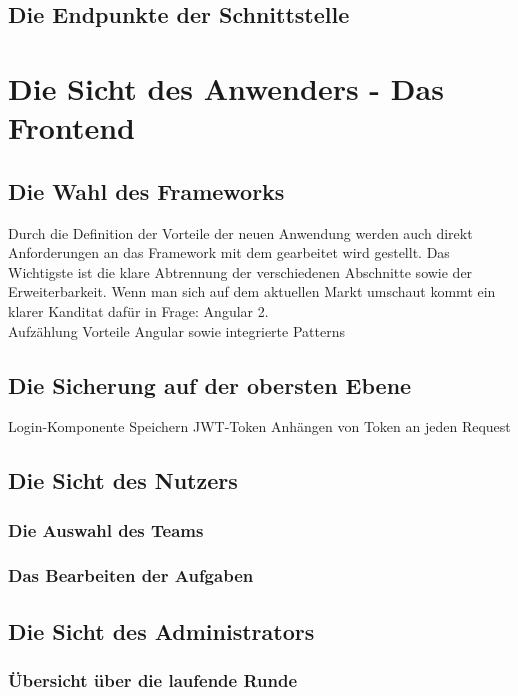 \section{Die Endpunkte der Schnittstelle}


\chapter{Die Sicht des Anwenders - Das Frontend}

\section{Die Wahl des Frameworks}

Durch die Definition der Vorteile der neuen Anwendung werden auch direkt Anforderungen an das Framework mit dem gearbeitet wird gestellt. Das Wichtigste ist die klare Abtrennung der verschiedenen Abschnitte sowie der Erweiterbarkeit. Wenn man sich auf dem aktuellen Markt umschaut kommt ein klarer Kanditat dafür in Frage: Angular 2. \\
Aufzählung Vorteile Angular sowie integrierte Patterns

\section{Die Sicherung auf der obersten Ebene}

Login-Komponente
Speichern JWT-Token
Anhängen von Token an jeden Request

\section{Die Sicht des Nutzers}

\subsection{Die Auswahl des Teams}

\subsection{Das Bearbeiten der Aufgaben}

\section{Die Sicht des Administrators}

\subsection{Übersicht über die laufende Runde}

